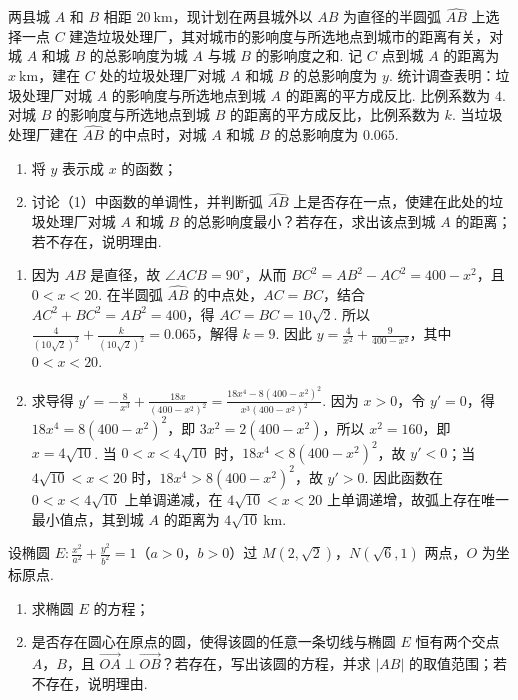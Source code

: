 \begin{problem}
两县城 \(A\) 和 \(B\) 相距 \(20 \mathrm{~km}\)，现计划在两县城外以 \(AB\) 为直径的半圆弧 \(\widehat{AB}\) 上选择一点 \(C\) 建造垃圾处理厂，其对城市的影响度与所选地点到城市的距离有关，对城 \(A\) 和城 \(B\) 的总影响度为城 \(A\) 与城 \(B\) 的影响度之和. 记 \(C\) 点到城 \(A\) 的距离为 \(x \mathrm{~km}\)，建在 \(C\) 处的垃圾处理厂对城 \(A\) 和城 \(B\) 的总影响度为 \(y\). 统计调查表明：垃圾处理厂对城 \(A\) 的影响度与所选地点到城 \(A\) 的距离的平方成反比. 比例系数为 \(4\). 对城 \(B\) 的影响度与所选地点到城 \(B\) 的距离的平方成反比，比例系数为 \(k\). 当垃圾处理厂建在 \(\widehat{AB}\) 的中点时，对城 \(A\) 和城 \(B\) 的总影响度为 \(0.065\).

\begin{enumerate}
\item 将 \(y\) 表示成 \(x\) 的函数；
\item 讨论（1）中函数的单调性，并判断弧 \(\widehat{AB}\) 上是否存在一点，使建在此处的垃圾处理厂对城 \(A\) 和城 \(B\) 的总影响度最小？若存在，求出该点到城 \(A\) 的距离；若不存在，说明理由.
\end{enumerate}
\end{problem}

\begin{solution}
\begin{enumerate}
\item 因为 \(AB\) 是直径，故 \(\angle ACB=90^\circ\)，从而 \(BC^2=AB^2-AC^2=400-x^2\)，且 \(0<x<20\). 在半圆弧 \(\widehat{AB}\) 的中点处，\(AC=BC\)，结合 \(AC^2+BC^2=AB^2=400\)，得 \(AC=BC=10\sqrt2\). 所以 \(\frac4{(10\sqrt2)^2}+\frac{k}{(10\sqrt2)^2}=0.065\)，解得 \(k=9\). 因此
\(\displaystyle y=\frac4{x^2}+\frac{9}{400-x^2}\)，其中 \(0<x<20\).
\item 求导得
\(\displaystyle y'=-\frac8{x^3}+\frac{18x}{(400-x^2)^2}=\frac{18x^4-8(400-x^2)^2}{x^3(400-x^2)^2}\).
因为 \(x>0\)，令 \(y'=0\)，得 \(18x^4=8(400-x^2)^2\)，即 \(3x^2=2(400-x^2)\)，所以 \(x^2=160\)，即 \(x=4\sqrt{10}\). 当 \(0<x<4\sqrt{10}\) 时，\(18x^4<8(400-x^2)^2\)，故 \(y'<0\)；当 \(4\sqrt{10}<x<20\) 时，\(18x^4>8(400-x^2)^2\)，故 \(y'>0\). 因此函数在 \(0<x<4\sqrt{10}\) 上单调递减，在 \(4\sqrt{10}<x<20\) 上单调递增，故弧上存在唯一最小值点，其到城 \(A\) 的距离为 \(4\sqrt{10}\mathrm{~km}\).
\end{enumerate}
\end{solution}

\begin{problem}
设椭圆 \(E: \frac{x^2}{a^2} + \frac{y^2}{b^2} = 1\)（\(a > 0\)，\(b > 0\)）过 \(M(2, \sqrt{2})\)，\(N(\sqrt{6}, 1)\) 两点，\(O\) 为坐标原点.

\begin{enumerate}
\item 求椭圆 \(E\) 的方程；
\item 是否存在圆心在原点的圆，使得该圆的任意一条切线与椭圆 \(E\) 恒有两个交点 \(A\)，\(B\)，且 \(\overrightarrow{OA} \perp \overrightarrow{OB}\)？若存在，写出该圆的方程，并求 \(|AB|\) 的取值范围；若不存在，说明理由.
\end{enumerate}
\end{problem}

